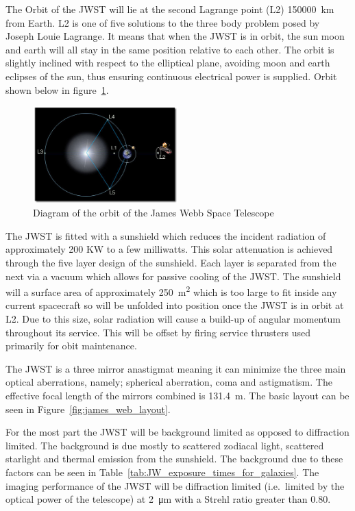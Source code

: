 	The Orbit of the JWST will lie at the second Lagrange point (L2) \SI{150000}{\kilo\metre} from Earth. L2 is one of five solutions to the three body problem posed by Joseph Louie Lagrange. It means that when the JWST is in orbit, the sun moon and earth will all stay in the same position relative to each other. The orbit is slightly inclined with respect to the elliptical plane, avoiding moon and earth eclipses of the sun, thus ensuring continuous electrical power is supplied. Orbit shown below in figure~\ref{fig:james_web_orbit}\cite{primary_mirror_construction}.
	\begin{figure}[htbp]
		\centering
			\includegraphics[width=0.5\textwidth]{../Images/JWST_orbit_L2.jpeg}
		\caption{Diagram of the orbit of the James Webb Space Telescope\label{fig:james_web_orbit}}
	\end{figure}

	The JWST is fitted with a sunshield which reduces the incident radiation of approximately 200 KW to a few milliwatts. This solar attenuation is achieved through the five layer design of the sunshield. Each layer is separated from the next via a vacuum which allows for passive cooling of the JWST. The sunshield will a surface area of approximately \SI{250}{\square\metre} which is too large to fit inside any current spacecraft so will be unfolded into position once the JWST is in orbit at L2. Due to this size, solar radiation will cause a build-up of angular momentum throughout its service. This will be offset by firing service thrusters used primarily for obit maintenance.

	The JWST is a three mirror anastigmat meaning it can minimize the three main optical aberrations, namely; spherical aberration, coma and astigmatism. The effective focal length of the mirrors combined is \SI{131.4}{\metre}. The basic layout can be seen in Figure~\ref{fig:james_web_layout}.

	For the most part the JWST will be background limited as opposed to diffraction limited. The background is due mostly to scattered zodiacal light, scattered starlight and thermal emission from the sunshield. The background due to these factors can be seen in Table~\ref{tab:JW_exposure_times_for_galaxies}. The imaging performance of the JWST will be diffraction limited (i.e.\ limited by the optical power of the telescope) at \SI{2}{\micro\metre} with a Strehl ratio greater than 0.80.

